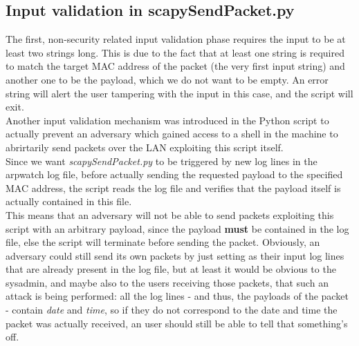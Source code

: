 \subsection{Input validation in scapySendPacket.py}
The first, non-security related input validation phase requires the input to be at least two strings long. This is due to the fact that at least one string is required to match the target MAC address of the packet (the very first input string) and another one to be the payload, which we do not want to be empty. An error string will alert the user tampering with the input in this case, and the script will exit.\\
Another input validation mechanism was introduced in the Python script to actually prevent an adversary which gained access to a shell in the machine to abrirtarily send packets over the LAN exploiting this script itself.\\
Since we want \textit{scapySendPacket.py} to be triggered by new log lines in the arpwatch log file, before actually sending the requested payload to the specified MAC address, the script reads the log file and verifies that the payload itself is actually contained in this file.\\
This means that an adversary will not be able to send packets exploiting this script with an arbitrary payload, since the payload \textbf{must} be contained in the log file, else the script will terminate before sending the packet. Obviously, an adversary could still send its own packets by just setting as their input log lines that are already present in the log file, but at least it would be obvious to the sysadmin, and maybe also to the users receiving those packets, that such an attack is being performed: all the log lines - and thus, the payloads of the packet - contain \textit{date} and \textit{time}, so if they do not correspond to the date and time the packet was actually received, an user should still be able to tell that something's off.
